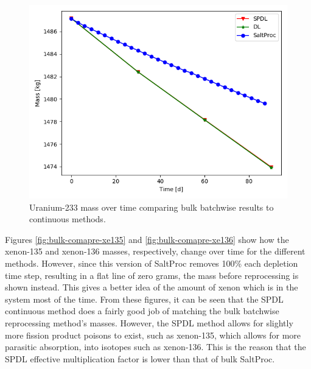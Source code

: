 \begin{figure}[H]
  \centering
  \includegraphics[scale=0.7]{images/soln-3-U233.png}
  \caption{Uranium-233 mass over time comparing bulk batchwise results to continuous methods.}
   \label{fig:bulk-comapre-u233}
\end{figure}

Figures \ref{fig:bulk-comapre-xe135} and \ref{fig:bulk-comapre-xe136} show how the xenon-135 and xenon-136 masses, respectively, change over time for the different methods. However, since this version of SaltProc removes 100\% each depletion time step, resulting in a flat line of zero grams, the mass before reprocessing is shown instead. This gives a better idea of the amount of xenon which is in the system most of the time. From these figures, it can be seen that the SPDL continuous method does a fairly good job of matching the bulk batchwise reprocessing method's masses. However, the SPDL method allows for slightly more fission product poisons to exist, such as xenon-135, which allows for more parasitic absorption, into isotopes such as xenon-136. This is the reason that the SPDL effective multiplication factor is lower than that of bulk SaltProc.

